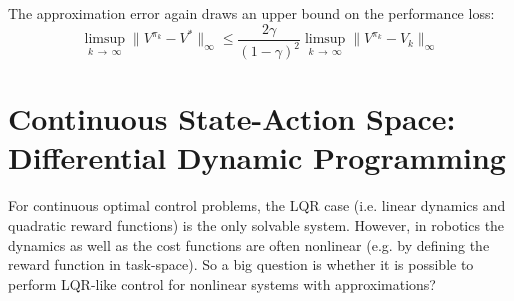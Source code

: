 			The approximation error again draws an upper bound on the performance loss:
			\begin{equation*}
				\limsup\limits_{k \,\to\, \infty} \big\lVert V^{\pi_k} - V^\ast \big\lVert_\infty \leq \frac{2 \gamma}{(1 - \gamma)^2} \limsup\limits_{k \,\to\, \infty} \big\lVert V^{\pi_k} - V_k \big\lVert_\infty
			\end{equation*}

	\section{Continuous State-Action Space: Differential Dynamic Programming}
		\label{sec:ddp}

		For continuous optimal control problems, the LQR case (i.e. linear dynamics and quadratic reward functions) is the only solvable system. However, in robotics the dynamics as well as the cost functions are often nonlinear (e.g. by defining the reward function in task-space). So a big question is whether it is possible to perform LQR-like control for nonlinear systems with approximations?

